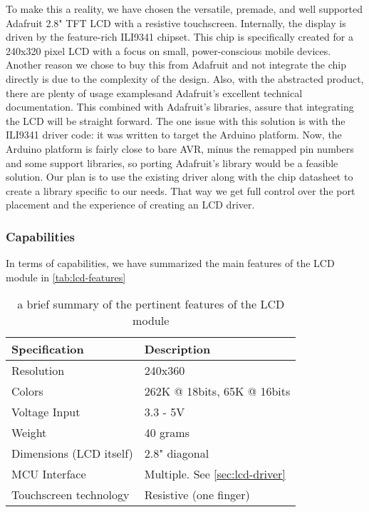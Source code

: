 To make this a reality, we have chosen the versatile, premade, and well
supported Adafruit 2.8" TFT LCD\cite{link3} with a resistive touchscreen.
Internally, the display is driven by the feature-rich
ILI9341 chipset.\cite{link22}
This chip is specifically created for a 240x320 pixel LCD with a focus on
small, power-conscious mobile devices. Another reason we chose to buy this from
Adafruit and not integrate the chip directly is due to the complexity of the
design. Also, with the abstracted product, there are
plenty
of usage examples\cite{link23}and Adafruit's
excellent
technical documentation.\cite{link24} This combined with Adafruit's
libraries\cite{link25}, assure
that integrating the LCD will be straight forward. The one issue with
this solution is with the ILI9341 driver code: it was written to target the
Arduino platform. Now, the Arduino platform is fairly close to bare AVR, minus
the remapped pin numbers and some support libraries, so porting Adafruit's
library would be a feasible solution. Our plan is to use the existing driver
along with the chip datasheet to create a library specific to our needs. That
way we get full control over the port placement and the experience of creating
an LCD driver.

\subsubsection{Capabilities}
In terms of capabilities, we have summarized the main features of the LCD module in \autoref{tab:lcd-features}

\begin{table}[H]
\centering
\begin{tabular}{|l|l|}
\hline
\bfseries Specification & \bfseries Description \\ \hline
Resolution & 240x360 \\ \hline
Colors & 262K @ 18bits, 65K @ 16bits \\ \hline
Voltage Input & 3.3 - 5V \\ \hline
Weight & 40 grams \\ \hline
Dimensions (LCD itself) & 2.8" diagonal \\ \hline
MCU Interface & Multiple. See \autoref{sec:lcd-driver}\\ \hline
Touchscreen technology & Resistive (one finger)\\
\hline
\end{tabular}
\caption{a brief summary of the pertinent features of the LCD module}
\label{tab:lcd-features}
\end{table}

